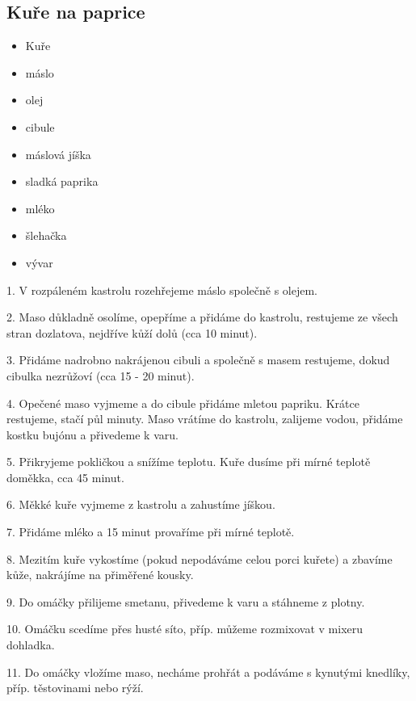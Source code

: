 \documentclass[10pt,a4paper]{article}
\newenvironment{myitemize}
{ \begin{itemize}
    \setlength{\itemsep}{0pt}
    \setlength{\parskip}{0pt}
    \setlength{\parsep}{0pt}     }
{ \end{itemize}                  }
\begin{document}
\subsection{Kuře na paprice}
\begin{minipage}[t]{0,5\textwidth}
\begin{myitemize} 
\item Kuře
\item máslo
\item olej
\item cibule
\item máslová jíška
\item sladká paprika
\item mléko
\item šlehačka
\item vývar
\end{myitemize}
\end{minipage}
\begin{minipage}[t]{0,5\textwidth}

1. V rozpáleném kastrolu rozehřejeme máslo společně s olejem.

2. Maso důkladně osolíme, opepříme a přidáme do kastrolu, restujeme ze všech stran dozlatova, nejdříve kůží dolů (cca 10 minut).

3. Přidáme nadrobno nakrájenou cibuli a společně s masem restujeme, dokud cibulka nezrůžoví (cca 15 - 20 minut).

4. Opečené maso vyjmeme a do cibule přidáme mletou papriku. Krátce restujeme, stačí půl minuty. Maso vrátíme do kastrolu, zalijeme vodou, přidáme kostku bujónu a přivedeme k varu.

5. Přikryjeme pokličkou a snížíme teplotu. Kuře dusíme při mírné teplotě doměkka, cca 45 minut.

6. Měkké kuře vyjmeme z kastrolu a zahustíme jíškou.

7. Přidáme mléko a 15 minut provaříme při mírné teplotě.

8. Mezitím kuře vykostíme (pokud nepodáváme celou porci kuřete) a zbavíme kůže, nakrájíme na přiměřené kousky.

9. Do omáčky přilijeme smetanu, přivedeme k varu a stáhneme z plotny.

10. Omáčku scedíme přes husté síto, příp. můžeme rozmixovat v mixeru dohladka.

11. Do omáčky vložíme maso, necháme prohřát a podáváme s kynutými knedlíky, příp. těstovinami nebo rýží.
\end{minipage}

\pagebreak
\end{document}
